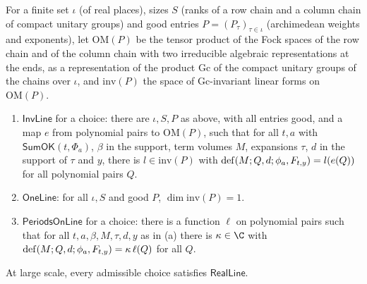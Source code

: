 \begin{definition}\label{def:pf:rowprops:invline}
For a finite set $\iota$ (of real places), sizes $S$ (ranks of a row chain and a column chain of compact unitary groups) and
good entries $P=(P_\tau)_{\tau\in\iota}$ (archimedean weights and exponents), let $\mathrm{OM}(P)$ be the tensor product of the
Fock spaces of the row chain and of the column chain with two irreducible algebraic representations at the ends, as a
representation of the product $\mathrm{Gc}$ of the compact unitary groups of the chains over $\iota$, and $\mathrm{inv}(P)$ the
space of $\mathrm{Gc}$-invariant linear forms on $\mathrm{OM}(P)$.
\begin{enumerate}[label=(\alph*)]
\item $\mathsf{InvLine}$ for a choice: there are $\iota,S,P$ as above, with all entries good, and a map $e$ from polynomial
pairs to $\mathrm{OM}(P)$, such that for all $t,a$ with $\mathsf{SumOK}(t,\Phi_a)$, $\beta$ in the support, term volumes $M$,
expansions $\tau$, $d$ in the support of $\tau$ and $y$, there is $l\in\mathrm{inv}(P)$ with
$\mathrm{def}(M;Q,d;\phi_a,F_{t,y})=l(e(Q))$ for all polynomial pairs $Q$.
\item $\mathsf{OneLine}$: for all $\iota,S$ and good $P$, $\dim\mathrm{inv}(P)=1$.
\item $\mathsf{PeriodsOnLine}$ for a choice: there is a function $\ell$ on polynomial pairs such that for all
$t,a,\beta,M,\tau,d,y$ as in (a) there is $\kappa\in\C$ with $\mathrm{def}(M;Q,d;\phi_a,F_{t,y})=\kappa\,\ell(Q)$ for all $Q$.
\end{enumerate}
\end{definition}

\begin{proposition}\label{pf:rowprops:realline}
At large scale, every admissible choice satisfies $\mathsf{RealLine}$.
\end{proposition}

